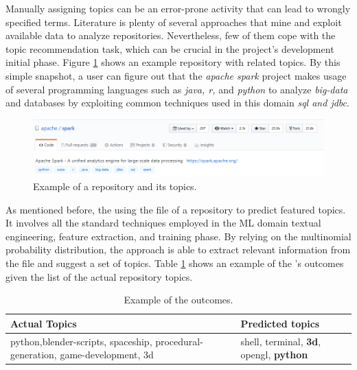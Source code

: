 
Manually assigning topics can be an error-prone activity that can lead to
wrongly specified terms. Literature is plenty of several approaches that mine and exploit available data to analyze repositories. Nevertheless, few of them cope with the topic recommendation task, which can be crucial in the project's development initial phase. Figure \ref{fig:spark} shows an example repository with related topics. By this simple snapshot, a \GH user can figure out that the \emph{apache spark} project makes usage of several programming languages such as \emph{java, r,} and \emph{python} to analyze \emph{big-data} and databases by exploiting common techniques used in this domain \ie \emph{sql and jdbc}. 

\begin{figure}[h!]
	\centering
	\includegraphics[width=0.8\linewidth]{figs/spark_topics.png}
	\caption{Example of a \GH repository and its topics.}
	\label{fig:spark}
\end{figure}

As mentioned before, the \MNB using the \RM file of a repository to predict featured topics. It involves all the standard techniques employed in the ML domain \ie textual engineering, feature extraction, and training phase. By relying on the multinomial probability distribution, the approach is able to extract relevant information from the \RM file and suggest a set of topics. Table \ref{tab:example} shows an example of the \MNB's outcomes given the list of the actual repository topics. 

\begin{table}[h]
\centering

\resizebox{8.5cm}{!} {

\begin{tabular}{| p{3.2cm} | p{3.2cm} | }
\hline
 \textbf{Actual Topics} &\textbf{ Predicted topics} \\ \hline
     python,blender-scripts, spaceship, procedural-generation, game-development, 3d        &  
  shell, terminal, \textbf{3d},	opengl,	\textbf{python}        \\ \hline

\end{tabular}
}
\caption{Example of the \MNB outcomes.}
\label{tab:example}
\end{table} 


